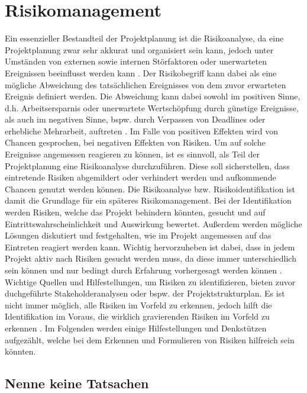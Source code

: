 \documentclass[ThesisDJ.tex]{subfiles}
\begin{document}
\section{Risikomanagement}
Ein essenzieller Bestandteil der Projektplanung ist die Risikoanalyse, da eine Projektplanung zwar sehr akkurat und organisiert sein kann, jedoch unter Umständen von externen sowie internen Störfaktoren oder unerwarteten Ereignissen beeinflusst werden kann \cite{cicek2022risikomanagement}.
Der Risikobegriff kann dabei als eine mögliche Abweichung des tatsächlichen Ereignisses von dem zuvor erwarteten Ereignis definiert werden. Die Abweichung kann dabei sowohl im positiven Sinne, d.h. Arbeitsersparnis oder unerwartete Wertschöpfung durch günstige Ereignisse, als auch im negativen Sinne, bspw. durch Verpassen von Deadlines oder erhebliche Mehrarbeit, auftreten \cite{holgerseibold2006}. Im Falle von positiven Effekten wird von Chancen gesprochen, bei negativen Effekten von Risiken. Um auf solche Ereignisse angemessen reagieren zu können, ist es sinnvoll, als Teil der Projektplanung eine Risikoanalyse durchzuführen. Diese soll sicherstellen, dass eintretende Risiken abgemildert oder verhindert werden und aufkommende Chancen genutzt werden können. Die Risikoanalyse bzw. Risikoidentifikation ist damit die Grundlage für ein späteres Risikomanagement.
Bei der Identifikation werden Risiken, welche das Projekt behindern könnten, gesucht und auf Eintrittswahrscheinlichkeit und Auswirkung bewertet. Außerdem werden mögliche Lösungen diskutiert und festgehalten, wie im Projekt angemessen auf das Eintreten reagiert werden kann. Wichtig hervorzuheben ist dabei, dass in jedem Projekt aktiv nach Risiken gesucht werden muss, da diese immer unterschiedlich sein können und nur bedingt durch Erfahrung vorhergesagt werden können \cite{cicek2022risikomanagement}. Wichtige Quellen und Hilfestellungen, um Risiken zu identifizieren, bieten zuvor duchgeführte Stakeholderanalysen oder bspw. der Projektstrukturplan. Es ist nicht immer möglich, alle Risiken im Vorfeld zu erkennen, jedoch hilft die Identifikation im Voraus, die wirklich gravierenden Risiken im Vorfeld zu erkennen \cite{holgerseibold2006}. Im Folgenden werden einige Hilfestellungen und Denkstützen aufgezählt, welche bei dem Erkennen und Formulieren von Risiken hilfreich sein könnten.

\subsection{Nenne keine Tatsachen}
\end{document}
